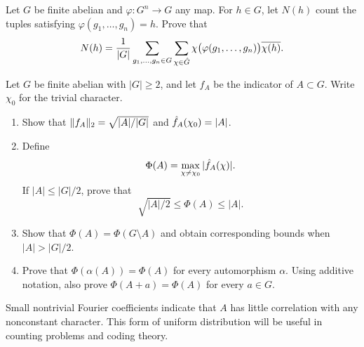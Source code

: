 
\begin{exo}
\label{exo-enombrement-solutions}
Let $G$ be finite abelian and $\varphi:G^n\to G$ any map. For $h\in G$, let
$N(h)$ count the tuples satisfying $\varphi(g_1,\ldots,g_n)=h$. Prove that
\[
 N(h)=\frac1{|G|}\sum_{g_1,\ldots,g_n\in G}
       \sum_{\chi\in\hat{G}}\chi\big(\varphi(g_1,\ldots,g_n)\big)\overline{\chi(h)}.
\]
\end{exo}


\begin{exo}
\label{exo-indicator-functions}
Let $G$ be finite abelian with $|G|\geq2$, and let $f_A$ be the indicator of
$A\subset G$. Write $\chi_0$ for the trivial character.
\begin{enumerate}
\item Show that $\lVert f_A\rVert_2=\sqrt{|A|/|G|}$ and $\hat{f}_A(\chi_0)=|A|$.
\item Define
\begin{equation}
\label{eq-defn-phi-ensemble}
 \Phi(A)=\max_{\chi\neq\chi_0}|\hat{f}_A(\chi)|.
\end{equation}
If $|A|\leq|G|/2$, prove that
\begin{equation}
\label{eq-ineq-regularity-function-indic}
 \sqrt{|A|/2}\leq\Phi(A)\leq|A|.
\end{equation}
\item Show that $\Phi(A)=\Phi(G\setminus A)$ and obtain corresponding bounds
when $|A|>|G|/2$.
\item Prove that $\Phi(\alpha(A))=\Phi(A)$ for every automorphism $\alpha$.
Using additive notation, also prove $\Phi(A+a)=\Phi(A)$ for every $a\in G$.
\end{enumerate}
Small nontrivial Fourier coefficients indicate that $A$ has little correlation
with any nonconstant character. This form of uniform distribution will be
useful in counting problems and coding theory.
\end{exo}


